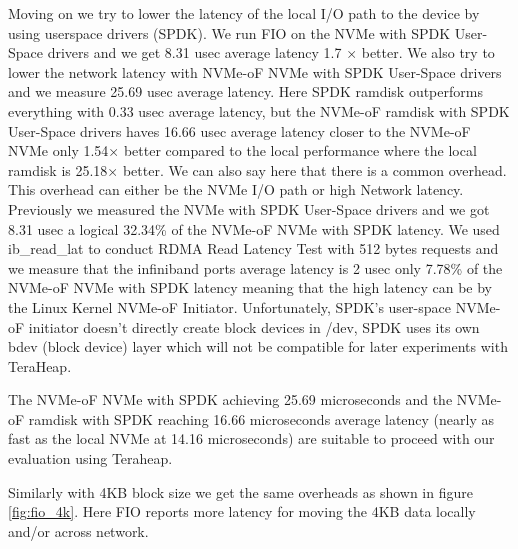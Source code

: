 \par Moving on we try to lower the latency of the local I/O path to the device by using userspace drivers (SPDK). We run FIO on the NVMe with SPDK User-Space drivers and we get 8.31 usec average latency 1.7 × better. We also try to lower the network latency with NVMe-oF NVMe with SPDK User-Space drivers and we measure 25.69 usec average latency. Here SPDK ramdisk outperforms everything with 0.33 usec average latency, but the NVMe-oF ramdisk with SPDK User-Space drivers haves 16.66 usec average latency closer to the NVMe-oF NVMe only 1.54× better compared to the local performance where the local ramdisk is 25.18× better. We can also say here that there is a common overhead. This overhead can either be the NVMe I/O path or high Network latency. Previously we measured the NVMe with SPDK User-Space drivers and we got 8.31 usec a logical 32.34\% of the NVMe-oF NVMe with SPDK latency. We used ib\_read\_lat to conduct RDMA Read Latency Test with 512 bytes requests and we measure that the infiniband ports average latency is 2 usec only 7.78\% of the NVMe-oF NVMe with SPDK latency meaning that the high latency can be by the Linux Kernel NVMe-oF Initiator. Unfortunately, SPDK's user-space NVMe-oF initiator doesn't directly create block devices in /dev, SPDK uses its own bdev (block device) layer which will not be compatible for later experiments with TeraHeap. 
\par The NVMe-oF NVMe with SPDK achieving 25.69 microseconds and the NVMe-oF ramdisk with SPDK reaching 16.66 microseconds average latency (nearly as fast as the local NVMe at 14.16 microseconds) are suitable to proceed with our evaluation using Teraheap.
\par Similarly with 4KB block size we get the same overheads as shown in figure \ref{fig:fio_4k}. Here FIO reports more latency for moving the 4KB data locally and/or across network.

